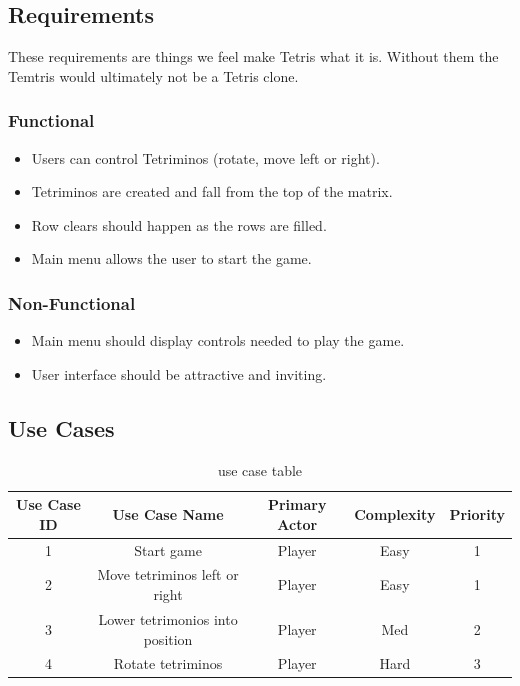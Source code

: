 \documentclass[10pt,conference,onecolumn,compsoc]{IEEEtran}
\begin{document}
\subsection{Requirements}
These requirements are things we feel make Tetris what it is. Without them the Temtris would ultimately not be a Tetris clone.

\subsubsection{Functional}
\begin{itemize}
\item Users can control Tetriminos (rotate, move left or right).
\item Tetriminos are created and fall from the top of the matrix.
\item Row clears should happen as the rows are filled.
\item Main menu allows the user to start the game.
\end{itemize}

\subsubsection{Non-Functional}
\begin{itemize}
\item Main menu should display controls needed to play the game.
\item User interface should be attractive and inviting.
\end{itemize}

\subsection{Use Cases}
\begin{table}
\centering
\begin{tabular}{|c|c|c|c|c|}
\hline
Use Case ID & Use Case Name & Primary Actor & Complexity & Priority \\
\hline \hline
1 & Start game & Player & Easy & 1\\
\hline
2 & Move tetriminos left or right & Player & Easy & 1\\
\hline
3 & Lower tetrimonios into position & Player & Med & 2\\
\hline
4 & Rotate tetriminos & Player & Hard & 3\\
\hline


\end{tabular}
\caption{use case table}
\label{tab:useCaseIndex}
\end{table}
\end{document}
